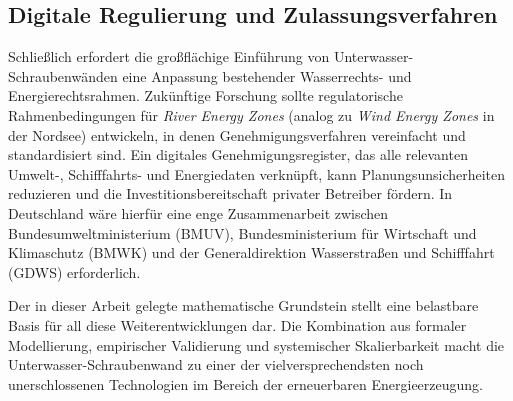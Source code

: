 ﻿\documentclass[a4paper,12pt]{article}
\theoremstyle{definition}
\begin{document}
\subsection{Digitale Regulierung und Zulassungsverfahren}

Schließlich erfordert die großflächige Einführung von Unterwasser-Schraubenwänden
eine Anpassung bestehender Wasserrechts- und Energierechtsrahmen. Zukünftige
Forschung sollte regulatorische Rahmenbedingungen für \emph{River Energy Zones}
(analog zu \emph{Wind Energy Zones} in der Nordsee) entwickeln, in denen
Genehmigungsverfahren vereinfacht und standardisiert sind. Ein digitales
Genehmigungsregister, das alle relevanten Umwelt-, Schifffahrts- und
Energiedaten verknüpft, kann Planungsunsicherheiten reduzieren und die
Investitionsbereitschaft privater Betreiber fördern. In Deutschland wäre
hierfür eine enge Zusammenarbeit zwischen Bundesumweltministerium (BMUV),
Bundesministerium für Wirtschaft und Klimaschutz (BMWK) und der
Generaldirektion Wasserstraßen und Schifffahrt (GDWS) erforderlich.

\bigskip

\noindent Der in dieser Arbeit gelegte mathematische Grundstein stellt eine
belastbare Basis für all diese Weiterentwicklungen dar. Die Kombination aus
formaler Modellierung, empirischer Validierung und systemischer Skalierbarkeit
macht die Unterwasser-Schraubenwand zu einer der vielversprechendsten noch
unerschlossenen Technologien im Bereich der erneuerbaren Energieerzeugung.
\end{document}
